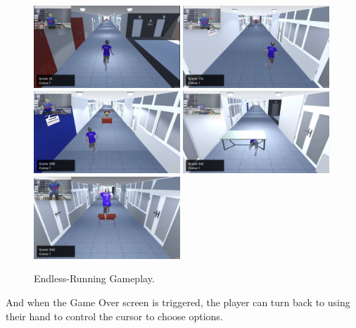 \documentclass[12pt]{article}
\begin{document}
\begin{figure}[H]
    \centering
    \includegraphics[width=0.49\textwidth]{game2.jpg}
    \includegraphics[width=0.49\textwidth]{game4.jpg}
    \includegraphics[width=0.49\textwidth]{game5.jpg}
    \includegraphics[width=0.49\textwidth]{game6.jpg}
    \includegraphics[width=0.49\textwidth]{game7.jpg}
    \caption{Endless-Running Gameplay.}
\end{figure}

And when the Game Over screen is triggered, the player can turn back to using their hand to control the cursor to choose options.
\end{document}
